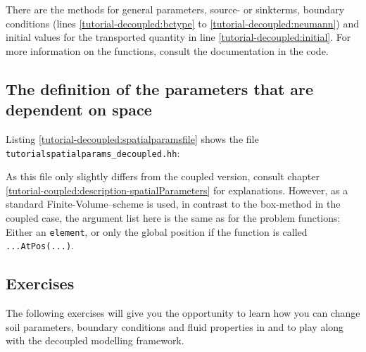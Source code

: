 There are the methods for general parameters, source- or
sinkterms, boundary conditions (lines \ref{tutorial-decoupled:bctype} to
\ref{tutorial-decoupled:neumann}) and initial values for the transported
quantity in line \ref{tutorial-decoupled:initial}. For more information
on the functions, consult the documentation in the code.

\subsection{The definition of the parameters that are dependent on space}\label{tutorial-decoupled:description-spatialParameters}

Listing \ref{tutorial-decoupled:spatialparamsfile} shows the file
\verb+tutorialspatialparams_decoupled.hh+:

\begin{lst}\label{tutorial-decoupled:spatialparamsfile} \mbox{}

\end{lst}
As this file only slightly differs from the coupled version, consult 
chapter \ref{tutorial-coupled:description-spatialParameters} for explanations.
However, as a standard Finite-Volume--scheme is used, in contrast to the box-method
in the coupled case, the argument list here is the same as for the problem 
functions: Either an \texttt{element}, or only the global position if the function is called \texttt{...AtPos(...)}.

\subsection{Exercises}
\label{tutorial-deoucpled:exercises}
The following exercises will give you the opportunity to learn how you can change 
soil parameters, boundary conditions and fluid properties in \Dumux and to play along 
with the decoupled modelling framework.

